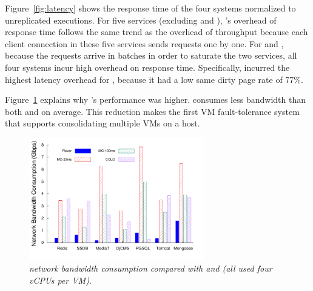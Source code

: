 Figure~\ref{fig:latency} shows the response time of the four systems normalized 
to unreplicated executions. For five services (excluding \redis and \ssdb), 
\xxx's overhead of response time follows the same trend as the 
overhead of throughput because each client connection in these five services 
sends requests one by one. For \redis and \ssdb, because the requests arrive in 
batches in order to saturate the two services, all four systems incur 
high overhead on response time. Specifically, \yyy incurred the highest latency
overhead for \ssdb, because it had a low same dirty page rate of 
77\%. 

Figure~\ref{fig:bandwidth} explains why \yyy's performance was higher. 
\yyy consumes \avgbandwidth less bandwidth than both \qemumc
and \colo on average. This reduction makes \yyy the first VM fault-tolerance 
system that supports consolidating multiple VMs on a host.

\begin{figure}[htbp]
\centering
\includegraphics[width=3in]{figures/FIG2__network_bandwidth}
\caption{{\em \yyy network bandwidth consumption compared with \qemumc and 
\colo (all used four vCPUs per VM)}.}
\label{fig:bandwidth}
\end{figure}
